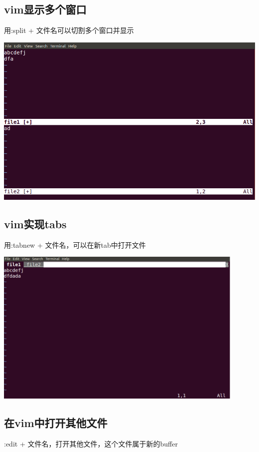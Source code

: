 \documentclass[UTF8,a4paper]{ctexart}
\begin{document}
\begin{sloppypar}
	\subsection{vim显示多个窗口}
	用:split + 文件名可以切割多个窗口并显示
	
	\includegraphics[width = 16cm]{17}
	
	\subsection{vim实现tabs}
	用:tabnew + 文件名，可以在新tab中打开文件
	
	\includegraphics[width = 12cm]{18}
	
	\subsection{在vim中打开其他文件}
	:edit + 文件名，打开其他文件，这个文件属于新的buffer
	

\end{sloppypar}
\end{document}
